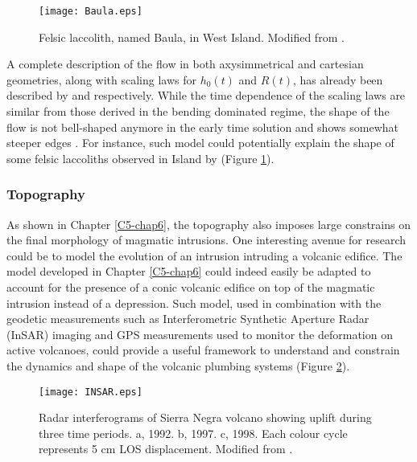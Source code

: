 \begin{figure}[h!]
  \begin{center}
    \graphicspath{ {/Users/thorey/Documents/These/Manuscript/Figure/Chapter7/} }
    \texttt{[image: Baula.eps]}
    \caption{Felsic laccolith, named Baula, in West Island. Modified
      from \citet{Anonymous:jHnLP36x}.}
    \label{C7-Baula}
  \end{center}
\end{figure}

A  complete description  of the
flow  in  both axysimmetrical  and  cartesian  geometries, along  with
scaling laws  for $h_0(t)$ and  $R(t)$, has already been  described by
\citet{Lister:2013ia}  and   \citet{Anonymous:QWXp_4JV}  respectively.
While the time  dependence of the scaling laws are  similar from those
derived in the bending dominated regime,  the shape of the flow is not
bell-shaped  anymore in  the early  time solution  and shows  somewhat
steeper  edges \citep{Anonymous:QWXp_4JV}.   For instance,  such model
could potentially explain the shape of some felsic laccoliths observed
in Island by \citet{Anonymous:jHnLP36x} (Figure \ref{C7-Baula}).

\subsubsection*{Topography}
\label{sec:topography-1}

As shown in Chapter \ref{C5-chap6},  the topography also imposes large
constrains  on  the  final  morphology of  magmatic  intrusions.   One
interesting avenue for research could be  to model the evolution of an
intrusion  intruding  a  volcanic  edifice.  The  model  developed  in
Chapter \ref{C5-chap6} could  indeed easily be adapted  to account for
the  presence of  a  conic volcanic  edifice on  top  of the  magmatic
intrusion instead  of a depression.   Such model, used  in combination
with  the  geodetic  measurements such  as  Interferometric  Synthetic
Aperture Radar  (InSAR) imaging and  GPS measurements used  to monitor
the deformation on active volcanoes,  could provide a useful framework
to understand  and constrain  the dynamics and  shape of  the volcanic
plumbing systems (Figure \ref{C7-Volcano}).
\begin{figure}[h!]
  \begin{center}
    \graphicspath{ {/Users/thorey/Documents/These/Manuscript/Figure/Chapter7/} }
    \texttt{[image: INSAR.eps]}
    \caption{Radar  interferograms  of  Sierra Negra  volcano  showing
      uplift during  three time periods.   a, 1992. b, 1997.  c, 1998.
      Each colour cycle represents 5 cm LOS displacement. Modified
      from \citep{Amelung:2000ko}.}
    \label{C7-Volcano}
  \end{center}
\end{figure}

